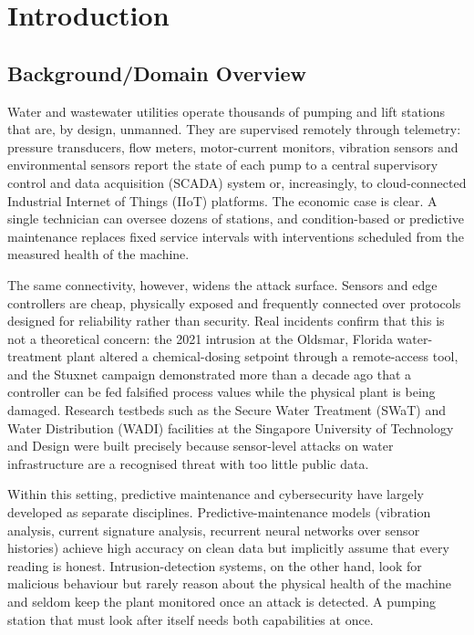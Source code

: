 \chapter{Introduction}

\section{Background/Domain Overview}

Water and wastewater utilities operate thousands of pumping and lift stations that are, by design, unmanned. They are supervised remotely through telemetry: pressure transducers, flow meters, motor-current monitors, vibration sensors and environmental sensors report the state of each pump to a central supervisory control and data acquisition (SCADA) system or, increasingly, to cloud-connected Industrial Internet of Things (IIoT) platforms. The economic case is clear. A single technician can oversee dozens of stations, and condition-based or predictive maintenance replaces fixed service intervals with interventions scheduled from the measured health of the machine.

The same connectivity, however, widens the attack surface. Sensors and edge controllers are cheap, physically exposed and frequently connected over protocols designed for reliability rather than security. Real incidents confirm that this is not a theoretical concern: the 2021 intrusion at the Oldsmar, Florida water-treatment plant altered a chemical-dosing setpoint through a remote-access tool, and the Stuxnet campaign demonstrated more than a decade ago that a controller can be fed falsified process values while the physical plant is being damaged. Research testbeds such as the Secure Water Treatment (SWaT) and Water Distribution (WADI) facilities at the Singapore University of Technology and Design were built precisely because sensor-level attacks on water infrastructure are a recognised threat with too little public data.

Within this setting, predictive maintenance and cybersecurity have largely developed as separate disciplines. Predictive-maintenance models (vibration analysis, current signature analysis, recurrent neural networks over sensor histories) achieve high accuracy on clean data but implicitly assume that every reading is honest. Intrusion-detection systems, on the other hand, look for malicious behaviour but rarely reason about the physical health of the machine and seldom keep the plant monitored once an attack is detected. A pumping station that must look after itself needs both capabilities at once.

